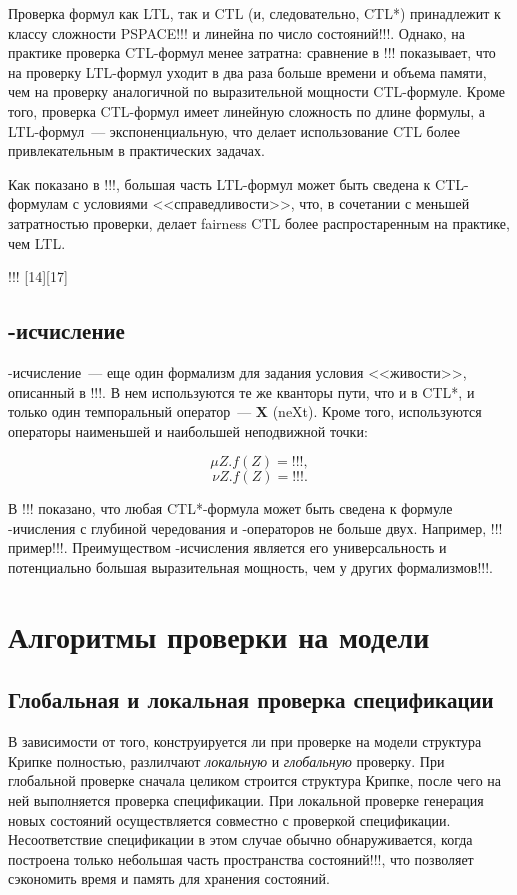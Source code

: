 \documentclass[a4paper,notitlepage,14pt]{article}
\begin{document}
Проверка формул как LTL, так и CTL (и, следовательно, CTL*) принадлежит к классу сложности
PSPACE!!! и линейна по число состояний!!!. Однако, на практике проверка CTL-формул менее
затратна: сравнение в !!! показывает, что на проверку LTL-формул уходит в два раза больше
времени и объема памяти, чем на проверку аналогичной по выразительной мощности
CTL-формуле. Кроме того, проверка CTL-формул имеет линейную сложность по длине формулы, а
LTL-формул~--- экспоненциальную, что делает использование CTL более привлекательным в
практических задачах.

Как показано в !!!, большая часть LTL-формул может быть сведена к CTL-формулам с условиями
<<справедливости>>, что, в сочетании с меньшей затратностью проверки, делает fairness CTL
более распростаренным на практике, чем LTL.

!!! [14][17]

\subsection{\mu-исчисление}
\label{sec:mu-calculus}

\mu-исчисление~--- еще один формализм для задания условия <<живости>>, описанный в !!!. В
нем используются те же кванторы пути, что и в CTL*, и только один темпоральный
оператор~--- $\mathbf{X}$ (neXt). Кроме того, используются операторы наименьшей и
наибольшей неподвижной точки:

$$ \mu Z. f(Z) = !!!, $$
$$ \nu Z. f(Z) = !!!. $$

В !!! показано, что любая CTL*-формула может быть сведена к формуле \mu-ичисления с
глубиной чередования \mu и \nu-операторов не больше двух. Например,
!!!пример!!!. Преимуществом \mu-исчисления является его универсальность и потенциально
большая выразительная мощность, чем у других формализмов!!!.

\section{Алгоритмы проверки на модели}
\label{sec:modelchk-methods}

\subsection{Глобальная и локальная проверка спецификации}
\label{sec:global}

В зависимости от того, конструируется ли при проверке на модели структура Крипке
полностью, разлилчают \emph{локальную} и \emph{глобальную} проверку. При глобальной
проверке сначала целиком строится структура Крипке, после чего на ней выполняется проверка
спецификации. При локальной проверке генерация новых состояний осуществляется совместно с
проверкой спецификации. Несоответствие спецификации в этом случае обычно обнаруживается,
когда построена только небольшая часть пространства состояний!!!, что позволяет сэкономить
время и память для хранения состояний.
\end{document}

